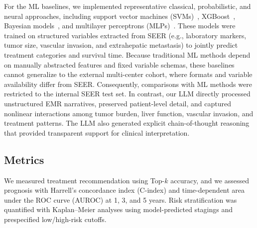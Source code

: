 \documentclass{article}
\begin{document}
For the ML baselines, we implemented representative classical, probabilistic, and neural approaches, including support vector machines (SVMs)~\cite{cortes1995svm}, XGBoost~\cite{chen2016xgboost}, Bayesian models~\cite{van2021bayesian}, and multilayer perceptrons (MLPs)~\cite{rumelhart1986backprop}. These models were trained on structured variables extracted from SEER (e.g., laboratory markers, tumor size, vascular invasion, and extrahepatic metastasis) to jointly predict treatment categories and survival time. Because traditional ML methods depend on manually abstracted features and fixed variable schemas, these baselines cannot generalize to the external multi-center cohort, where formats and variable availability differ from SEER. Consequently, comparisons with ML methods were restricted to the internal SEER test set. In contrast, our LLM directly processed unstructured EMR narratives, preserved patient-level detail, and captured nonlinear interactions among tumor burden, liver function, vascular invasion, and treatment patterns. The LLM also generated explicit chain-of-thought reasoning that provided transparent support for clinical interpretation.


\subsection{Metrics}
We measured treatment recommendation using Top-$k$ accuracy, and we assessed prognosis with Harrell’s concordance index (C-index) and time-dependent area under the ROC curve (AUROC) at 1, 3, and 5 years. Risk stratification was quantified with Kaplan–Meier analyses using model-predicted stagings and prespecified low/high-risk cutoffs. 
\end{document}
